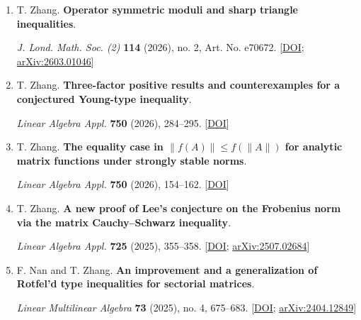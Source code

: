 \documentclass[11pt,letterpaper]{article}
\begin{document}
\begin{enumerate}[resume*=published]
\item \begin{minipage}[t]{\linewidth}\raggedright T. Zhang. \textbf{Operator symmetric moduli and sharp triangle inequalities}.\par \textit{J. Lond. Math. Soc. (2)} \textbf{114} (2026), no. 2, Art. No. e70672. [\href{https://doi.org/10.1112/jlms.70672}{DOI}; \href{https://arxiv.org/abs/2603.01046}{arXiv:2603.01046}]\end{minipage}

\item \begin{minipage}[t]{\linewidth}\raggedright T. Zhang. \textbf{Three-factor positive results and counterexamples for a conjectured Young-type inequality}.\par \textit{Linear Algebra Appl.} \textbf{750} (2026), 284--295. [\href{https://doi.org/10.1016/j.laa.2026.07.014}{DOI}]\end{minipage}

\item \begin{minipage}[t]{\linewidth}\raggedright T. Zhang. \textbf{The equality case in \(\lVert f(A)\rVert\leq f(\lVert A\rVert)\) for analytic matrix functions under strongly stable norms}.\par \textit{Linear Algebra Appl.} \textbf{750} (2026), 154--162. [\href{https://doi.org/10.1016/j.laa.2026.07.011}{DOI}]\end{minipage}

\item \begin{minipage}[t]{\linewidth}\raggedright T. Zhang. \textbf{A new proof of Lee's conjecture on the Frobenius norm via the matrix Cauchy--Schwarz inequality}.\par \textit{Linear Algebra Appl.} \textbf{725} (2025), 355--358. [\href{https://doi.org/10.1016/j.laa.2025.07.017}{DOI}; \href{https://arxiv.org/abs/2507.02684}{arXiv:2507.02684}]\end{minipage}

\item \begin{minipage}[t]{\linewidth}\raggedright F. Nan and T. Zhang. \textbf{An improvement and a generalization of Rotfel'd type inequalities for sectorial matrices}.\par \textit{Linear Multilinear Algebra} \textbf{73} (2025), no. 4, 675--683. [\href{https://doi.org/10.1080/03081087.2024.2376560}{DOI}; \href{https://arxiv.org/abs/2404.12849}{arXiv:2404.12849}]\end{minipage}


\end{enumerate}
\end{document}
